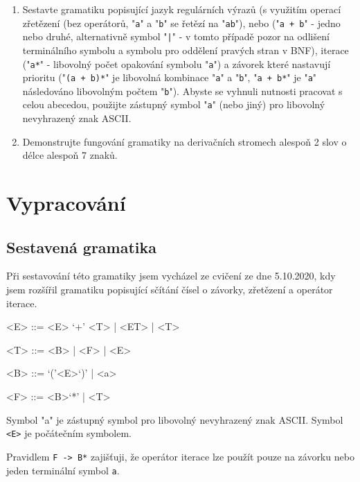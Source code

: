 \documentclass[12pt, a4paper]{article}
\let\oldsection\section
\renewcommand\section{\clearpage\oldsection}
\begin{document}
\begin{enumerate}
    \item Sestavte gramatiku popisující jazyk regulárních výrazů (s využitím operací zřetězení (bez operátorů, "\texttt{a}" a "\texttt{b}" se řetězí na "\texttt{ab}"), nebo ("\texttt{a + b}" - jedno nebo druhé, alternativně symbol "\texttt{|}" - v tomto případě pozor na odlišení terminálního symbolu a symbolu pro oddělení pravých stran v BNF), iterace ("\texttt{a*}" - libovolný počet opakování symbolu "\texttt{a}") a závorek které nastavují prioritu ("\texttt{(a + b)*}" je libovolná kombinace "\texttt{a}" a "\texttt{b}", "\texttt{a + b*}" je "\texttt{a}" následováno libovolným počtem "\texttt{b}").
Abyste se vyhnuli nutnosti pracovat s celou abecedou, použijte zástupný symbol "\texttt{a}" (nebo jiný) pro libovolný nevyhrazený znak ASCII.

    \item Demonstrujte fungování gramatiky na derivačních stromech alespoň 2 slov o délce alespoň 7 znaků. 

\end{enumerate}

    \section{Vypracování}

    \subsection{Sestavená gramatika}
    Při sestavování této gramatiky jsem vycházel ze cvičení ze dne 5.10.2020, kdy jsem rozšířil gramatiku popisující sčítání čísel o závorky, zřetězení a operátor iterace. 

    \begin{grammar}

        <E> ::= <E> `+' <T> | <ET> | <T>
        
        <T> ::= <B> | <F> | <E>

        <B> ::= `('<E>`)' | <a>

        <F> ::= <B>`*' | <T>
%        
%
    \end{grammar}

\noindent Symbol "a" je zástupný symbol pro libovolný nevyhrazený znak ASCII. Symbol \texttt{<E>} je počátečním symbolem.

Pravidlem \texttt{F -> B*} zajišťuji, že operátor iterace lze použít pouze na závorku nebo jeden terminální symbol \texttt{a}.
\end{document}
